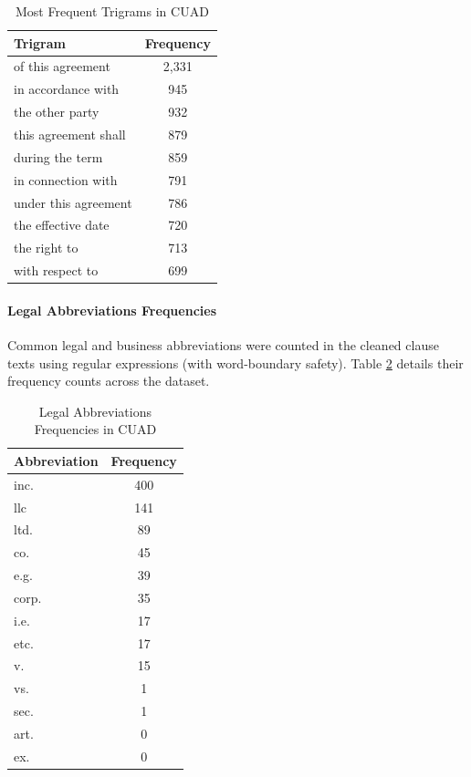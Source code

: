 \documentclass[12pt, a4paper]{report}
\begin{document}
\begin{table}[h]
\centering
\small
\begin{tabular}{lc}
\toprule
Trigram & Frequency \\
\hline
of this agreement & 2,331 \\
in accordance with & 945 \\
the other party & 932 \\
this agreement shall & 879 \\
during the term & 859 \\
in connection with & 791 \\
under this agreement & 786 \\
the effective date & 720 \\
the right to & 713 \\
with respect to & 699 \\
\bottomrule
\end{tabular}
\caption{Most Frequent Trigrams in CUAD}
\label{tab:frequent_trigrams}
\end{table}

\paragraph{Legal Abbreviations Frequencies}
Common legal and business abbreviations were counted in the cleaned clause texts using regular expressions (with word-boundary safety). Table \ref{tab:legal_abbreviations} details their frequency counts across the dataset.

\begin{table}[h]
\centering
\small
\begin{tabular}{lc}
\toprule
Abbreviation & Frequency \\
\hline
inc. & 400 \\
llc & 141 \\
ltd. & 89 \\
co. & 45 \\
e.g. & 39 \\
corp. & 35 \\
i.e. & 17 \\
etc. & 17 \\
v. & 15 \\
vs. & 1 \\
sec. & 1 \\
art. & 0 \\
ex. & 0 \\
\bottomrule
\end{tabular}
\caption{Legal Abbreviations Frequencies in CUAD}
\label{tab:legal_abbreviations}
\end{table}
\end{document}
